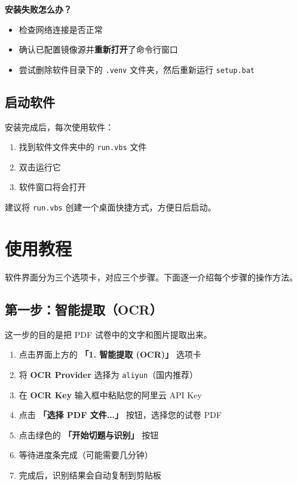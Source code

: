 \documentclass[UTF8,zihao=-4,openany]{ctexbook}
\begin{document}
\begin{WarnBox}
	\textbf{安装失败怎么办？}
	\begin{itemize}
		\item 检查网络连接是否正常
		\item 确认已配置镜像源并\textbf{重新打开}了命令行窗口
		\item 尝试删除软件目录下的 \texttt{.venv} 文件夹，然后重新运行 \texttt{setup.bat}
	\end{itemize}
\end{WarnBox}

\section{启动软件}

安装完成后，每次使用软件：

\begin{enumerate}
	\item 找到软件文件夹中的 \texttt{run.vbs} 文件
	\item 双击运行它
	\item 软件窗口将会打开
\end{enumerate}

\begin{TipBox}
	建议将 \texttt{run.vbs} 创建一个桌面快捷方式，方便日后启动。
\end{TipBox}

\chapter{使用教程}

软件界面分为三个选项卡，对应三个步骤。下面逐一介绍每个步骤的操作方法。

\section{第一步：智能提取（OCR）}

这一步的目的是把 PDF 试卷中的文字和图片提取出来。

\begin{StepBox}[操作步骤]
	\begin{enumerate}
		\item 点击界面上方的 \textbf{「1. 智能提取 (OCR)」} 选项卡
		\item 将 \textbf{OCR Provider} 选择为 \texttt{aliyun}（国内推荐）
		\item 在 \textbf{OCR Key} 输入框中粘贴您的阿里云 API Key
		\item 点击 \textbf{「选择 PDF 文件...」} 按钮，选择您的试卷 PDF
		\item 点击绿色的 \textbf{「开始切题与识别」} 按钮
		\item 等待进度条完成（可能需要几分钟）
		\item 完成后，识别结果会自动复制到剪贴板
	\end{enumerate}
\end{StepBox}
\end{document}
